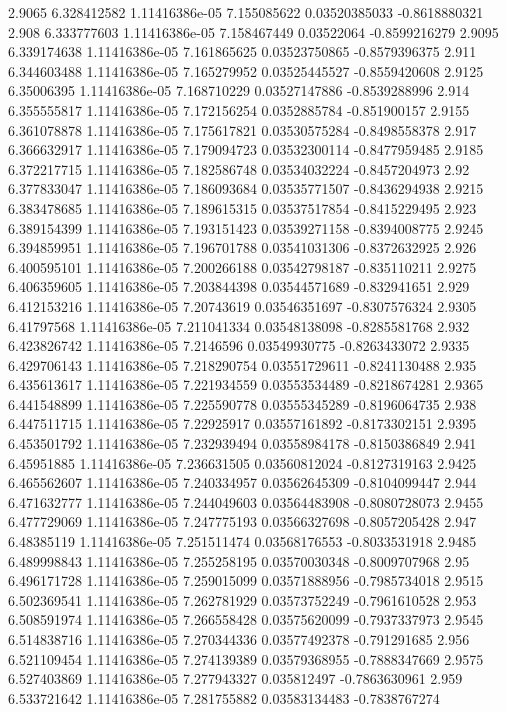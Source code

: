 {2.9065 6.328412582 1.11416386e-05 7.155085622 0.03520385033 -0.8618880321
2.908 6.333777603 1.11416386e-05 7.158467449 0.03522064 -0.8599216279
2.9095 6.339174638 1.11416386e-05 7.161865625 0.03523750865 -0.8579396375
2.911 6.344603488 1.11416386e-05 7.165279952 0.03525445527 -0.8559420608
2.9125 6.35006395 1.11416386e-05 7.168710229 0.03527147886 -0.8539288996
2.914 6.355555817 1.11416386e-05 7.172156254 0.0352885784 -0.851900157
2.9155 6.361078878 1.11416386e-05 7.175617821 0.03530575284 -0.8498558378
2.917 6.366632917 1.11416386e-05 7.179094723 0.03532300114 -0.8477959485
2.9185 6.372217715 1.11416386e-05 7.182586748 0.03534032224 -0.8457204973
2.92 6.377833047 1.11416386e-05 7.186093684 0.03535771507 -0.8436294938
2.9215 6.383478685 1.11416386e-05 7.189615315 0.03537517854 -0.8415229495
2.923 6.389154399 1.11416386e-05 7.193151423 0.03539271158 -0.8394008775
2.9245 6.394859951 1.11416386e-05 7.196701788 0.03541031306 -0.8372632925
2.926 6.400595101 1.11416386e-05 7.200266188 0.03542798187 -0.835110211
2.9275 6.406359605 1.11416386e-05 7.203844398 0.03544571689 -0.832941651
2.929 6.412153216 1.11416386e-05 7.20743619 0.03546351697 -0.8307576324
2.9305 6.41797568 1.11416386e-05 7.211041334 0.03548138098 -0.8285581768
2.932 6.423826742 1.11416386e-05 7.2146596 0.03549930775 -0.8263433072
2.9335 6.429706143 1.11416386e-05 7.218290754 0.03551729611 -0.8241130488
2.935 6.435613617 1.11416386e-05 7.221934559 0.03553534489 -0.8218674281
2.9365 6.441548899 1.11416386e-05 7.225590778 0.03555345289 -0.8196064735
2.938 6.447511715 1.11416386e-05 7.22925917 0.03557161892 -0.8173302151
2.9395 6.453501792 1.11416386e-05 7.232939494 0.03558984178 -0.8150386849
2.941 6.45951885 1.11416386e-05 7.236631505 0.03560812024 -0.8127319163
2.9425 6.465562607 1.11416386e-05 7.240334957 0.03562645309 -0.8104099447
2.944 6.471632777 1.11416386e-05 7.244049603 0.03564483908 -0.8080728073
2.9455 6.477729069 1.11416386e-05 7.247775193 0.03566327698 -0.8057205428
2.947 6.48385119 1.11416386e-05 7.251511474 0.03568176553 -0.8033531918
2.9485 6.489998843 1.11416386e-05 7.255258195 0.03570030348 -0.8009707968
2.95 6.496171728 1.11416386e-05 7.259015099 0.03571888956 -0.7985734018
2.9515 6.502369541 1.11416386e-05 7.262781929 0.03573752249 -0.7961610528
2.953 6.508591974 1.11416386e-05 7.266558428 0.03575620099 -0.7937337973
2.9545 6.514838716 1.11416386e-05 7.270344336 0.03577492378 -0.791291685
2.956 6.521109454 1.11416386e-05 7.274139389 0.03579368955 -0.7888347669
2.9575 6.527403869 1.11416386e-05 7.277943327 0.035812497 -0.7863630961
2.959 6.533721642 1.11416386e-05 7.281755882 0.03583134483 -0.7838767274
}
